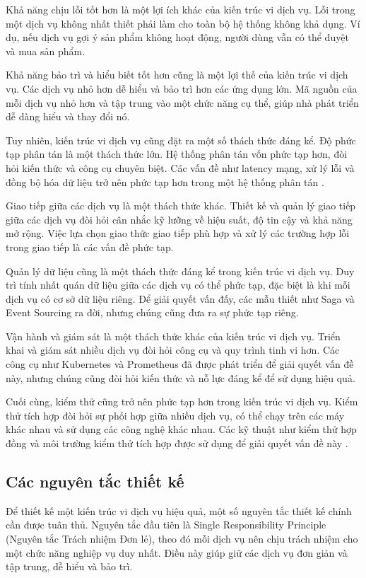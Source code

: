Khả năng chịu lỗi tốt hơn là một lợi ích khác của kiến trúc vi dịch vụ. Lỗi
trong một dịch vụ không nhất thiết phải làm cho toàn bộ hệ thống không khả
dụng. Ví dụ, nếu dịch vụ gợi ý sản phẩm không hoạt động, người dùng vẫn có thể
duyệt và mua sản phẩm.

Khả năng bảo trì và hiểu biết tốt hơn cũng là một lợi thế của kiến trúc
vi dịch vụ. Các dịch vụ nhỏ hơn dễ hiểu và bảo trì hơn các ứng dụng lớn. Mã
nguồn của mỗi dịch vụ nhỏ hơn và tập trung vào một chức năng cụ thể, giúp nhà
phát triển dễ dàng hiểu và thay đổi nó.

Tuy nhiên, kiến trúc vi dịch vụ cũng đặt ra một số thách thức đáng kể. Độ
phức tạp phân tán là một thách thức lớn. Hệ thống phân tán vốn phức tạp hơn,
đòi hỏi kiến thức và công cụ chuyên biệt. Các vấn đề như latency mạng, xử lý
lỗi và đồng bộ hóa dữ liệu trở nên phức tạp hơn trong một hệ thống phân tán \cite{newman2015}.

Giao tiếp giữa các dịch vụ là một thách thức khác. Thiết kế và quản lý giao
tiếp giữa các dịch vụ đòi hỏi cân nhắc kỹ lưỡng về hiệu suất, độ tin cậy và khả
năng mở rộng. Việc lựa chọn giao thức giao tiếp phù hợp và xử lý các trường hợp
lỗi trong giao tiếp là các vấn đề phức tạp.

Quản lý dữ liệu cũng là một thách thức đáng kể trong kiến trúc vi dịch vụ.
Duy trì tính nhất quán dữ liệu giữa các dịch vụ có thể phức tạp, đặc biệt là
khi mỗi dịch vụ có cơ sở dữ liệu riêng. Để giải quyết vấn đấy, các mẫu thiết như Saga và Event Sourcing ra đời, nhưng chúng cũng đưa ra sự phức tạp riêng.

Vận hành và giám sát là một thách thức khác của kiến trúc vi dịch vụ. Triển
khai và giám sát nhiều dịch vụ đòi hỏi công cụ và quy trình tinh vi hơn. Các
công cụ như Kubernetes và Prometheus đã được phát triển để giải quyết vấn đề
này, nhưng chúng cũng đòi hỏi kiến thức và nỗ lực đáng kể để sử dụng hiệu quả.

Cuối cùng, kiểm thử cũng trở nên phức tạp hơn trong kiến trúc vi dịch vụ.
Kiểm thử tích hợp đòi hỏi sự phối hợp giữa nhiều dịch vụ, có thể chạy trên các
máy khác nhau và sử dụng các công nghệ khác nhau. Các kỹ thuật như kiểm thử hợp
đồng và môi trường kiểm thử tích hợp được sử dụng để giải quyết vấn đề này \cite{newman2015}.

\subsection{Các nguyên tắc thiết kế}
Để thiết kế một kiến trúc vi dịch vụ hiệu quả, một số nguyên tắc thiết kế chính cần được tuân thủ. Nguyên tắc đầu tiên là Single Responsibility Principle (Nguyên tắc Trách nhiệm Đơn lẻ), theo đó mỗi dịch vụ nên chịu trách nhiệm cho một chức năng nghiệp vụ duy nhất. Điều này giúp giữ các dịch vụ đơn giản và tập trung, dễ hiểu và bảo trì.


